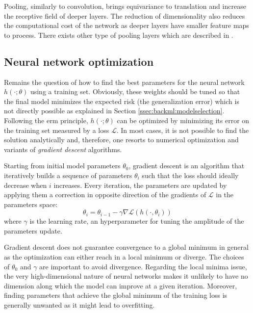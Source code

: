 Pooling, similarly to convolution, brings equivariance to translation and increase
the receptive field of deeper layers. The reduction of dimensionality also reduces
the computational cost of the network as deeper layers have smaller feature maps
to process. There exists other type of pooling layers which are described in
\parencite{gholamalinezhad2020pooling}.

\subsection{Neural network optimization}
\label{ssec:backml:dl:opti}
Remains the question of how to find the best parameters for the neural network
$h(\cdot; \theta)$ using a training set. Obviously, these weights should be tuned
so that the final model minimizes the expected risk (\ie the generalization error)
which is not directly possible as explained in Section \ref{ssec:backml:modelselection}.
Following the \acrshort{erm} principle, $h(\cdot; \theta)$ can be optimized by
minimizing its error on the training set measured by a loss $\mathcal{L}$. In most
cases, it is not possible to find the solution analytically and, therefore, one
resorts to numerical optimization and variants of \textit{gradient descent}
algorithms.

Starting from initial model parameters $\theta_0$, gradient descent is an algorithm
that iteratively builds a sequence of parameters $\theta_i$ such that the loss
should ideally decrease when $i$ increases. Every iteration, the parameters are updated by
applying them a correction in opposite direction of the gradients of $\mathcal{L}$ in the parameters space:
\begin{equation}
\label{eqn:backml:gradientdescent}
\theta_{i} = \theta_{i-1} - \gamma \nabla \mathcal{L}(h(\cdot, \theta_{i}))
\end{equation}
where $\gamma$ is the learning rate, an hyperparameter for tuning the amplitude of the parameters update. 

Gradient descent does not guarantee convergence to a global minimum in general as
the optimization can either reach in a local minimum or diverge. The choices of
$\theta_0$ and $\gamma$ are important to avoid divergence. Regarding the local
minima issue, the very high-dimensional nature of neural networks makes it unlikely
to have no dimension along which the model can improve at a given iteration.
Moreover, finding parameters that achieve the global minimum of the training loss
is generally unwanted as it might lead to overfitting.

